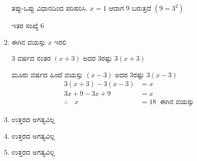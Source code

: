 \begin{enumerate}
ತಪ್ಪು-ಒಪ್ಪು ವಿಧಾನದಿಂದ ಪರಿಹರಿಸಿ. $x = 1$ ಆದಾಗ $9$ ಬರುತ್ತದೆ $(9 = 3^{2})$

ಇತರ ಸಂಖ್ಯೆ 6 

\item ಈಗಿನ ವಯಸ್ಸು $x$ ಇರಲಿ 

3 ವರ್ಷದ ನಂತರ $(x+3)$ ಅದರ 3ರಷ್ಟು $3(x+3)$ 

ಮೂರು ವರ್ಷದ ಹಿಂದೆ ವಯಸ್ಸು $(x-3)$ ಅದರ 3ರಷ್ಟು $3(x-3)$
\begin{align*}
3(x + 3) -3(x - 3) & = x\\
3x + 9 - 3x + 9 & = x\\
\therefore\quad x & = 18~\text{ ಈಗಿನ ವಯಸ್ಸು}
\end{align*}

\item ಉತ್ತರದ ಅಗತ್ಯವಿಲ್ಲ 

\item ಉತ್ತರದ ಅಗತ್ಯವಿಲ್ಲ 

\item ಉತ್ತರದ ಅಗತ್ಯವಿಲ್ಲ 
\end{enumerate}
